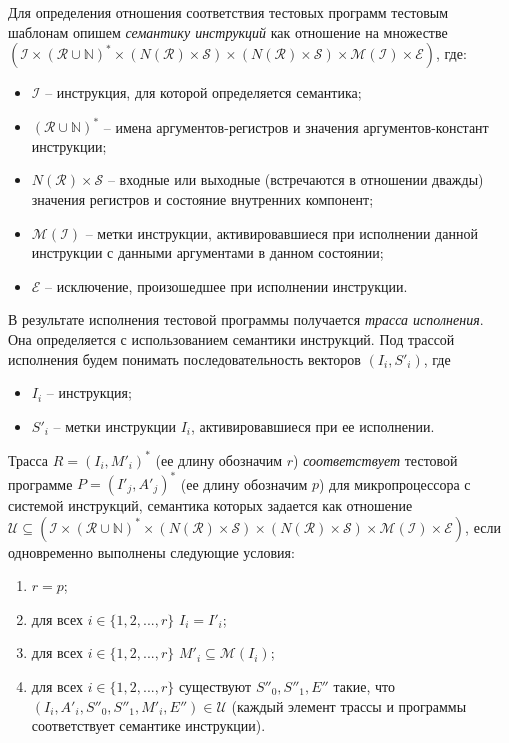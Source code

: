 Для определения отношения соответствия тестовых программ тестовым шаблонам опишем \emph{семантику инструкций} как отношение на множестве $(\mathcal{I} \times (\mathcal{R} \cup \mathds{N})^* \times (N(\mathcal{R}) \times \mathcal{S}) \times (N(\mathcal{R}) \times \mathcal{S}) \times \mathcal{M}(\mathcal{I}) \times \mathcal{E})$, где:
\begin{itemize}
  \item $\mathcal{I}$ -- инструкция, для которой определяется семантика;
  \item $(\mathcal{R} \cup \mathds{N})^*$ -- имена аргументов-регистров и значения аргументов-констант инструкции;
  \item $N(\mathcal{R}) \times \mathcal{S}$ -- входные или выходные (встречаются в отношении дважды) значения регистров и состояние внутренних компонент;
  \item $\mathcal{M}(\mathcal{I})$ -- метки инструкции, активировавшиеся при исполнении данной инструкции с данными аргументами в данном состоянии;
  \item $\mathcal{E}$ -- исключение, произошедшее при исполнении инструкции.
\end{itemize}

В результате исполнения тестовой программы получается \emph{трасса исполнения}. Она определяется с использованием семантики инструкций. Под трассой исполнения будем понимать последовательность векторов $(I_i, S'_i)$, где
\begin{itemize}
  \item $I_i$ -- инструкция;
  \item $S'_i$ -- метки инструкции $I_i$, активировавшиеся при ее исполнении.
\end{itemize}

Трасса $R = (I_i, M'_i)^*$ (ее длину обозначим $r$) \emph{соответствует} тестовой программе $P = (I'_j, A'_j)^*$ (ее длину обозначим $p$)  для микропроцессора с системой инструкций, семантика которых задается как отношение $\mathcal{U} \subseteq (\mathcal{I} \times (\mathcal{R} \cup \mathds{N})^* \times (N(\mathcal{R}) \times \mathcal{S}) \times (N(\mathcal{R}) \times \mathcal{S}) \times \mathcal{M}(\mathcal{I}) \times \mathcal{E})$, если одновременно выполнены следующие условия:
\begin{enumerate}
  \item $r = p$;
  \item для всех $i \in \{1, 2, ..., r\}$ $I_i = I'_i$;
  \item для всех $i \in \{1, 2, ..., r\}$ $M'_i \subseteq \mathcal{M}(I_i)$;
  \item для всех $i \in \{1, 2, ..., r\}$ существуют $S''_0, S''_1, E''$ такие, что \\$(I_i, A'_i, S''_0, S''_1, M'_i, E'') \in \mathcal{U}$ (каждый элемент трассы и программы соответствует семантике инструкции).
\end{enumerate}


